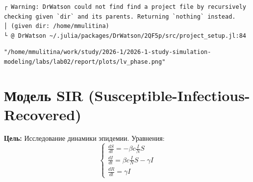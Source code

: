 \documentclass[
  english,
  russian,
  12pt,
  a4paper,
  DIV=11,
  numbers=noendperiod]{scrartcl}
\begin{document}
\begin{verbatim}
┌ Warning: DrWatson could not find find a project file by recursively checking given `dir` and its parents. Returning `nothing` instead.
│ (given dir: /home/mmulitina)
└ @ DrWatson ~/.julia/packages/DrWatson/2QF5p/src/project_setup.jl:84
\end{verbatim}

\begin{verbatim}
"/home/mmulitina/work/study/2026-1/2026-1-study-simulation-modeling/labs/lab02/report/plots/lv_phase.png"
\end{verbatim}

\section{Модель SIR
(Susceptible-Infectious-Recovered)}\label{ux43cux43eux434ux435ux43bux44c-sir-susceptible-infectious-recovered}

\textbf{Цель:} Исследование динамики эпидемии. Уравнения: \[
\begin{cases}
\frac{dS}{dt} = -\beta c \frac{I}{N} S \\
\frac{dI}{dt} = \beta c \frac{I}{N} S - \gamma I \\
\frac{dR}{dt} = \gamma I
\end{cases}
\]
\end{document}
